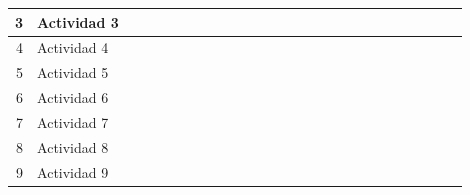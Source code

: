\documentclass[10pt,letterpaper]{report}
\begin{document}
\begin{landscape}
\begin{table}[htbp]
{\begin{tabular}{|r|l|r|r|r|r|r|r|r|r|r|r|r|r|r|r|r|r|r|r|r|r|r|r|r|r|}
            \midrule
            3     & Actividad 3 & \cellcolor[rgb]{ .557,  .663,  .859} & \cellcolor[rgb]{ .557,  .663,  .859} & \cellcolor[rgb]{ .557,  .663,  .859} &       &       &       &       &       &       &       &       &       &       &       &       &       &       &       &       &       &       &       &       &  \\
            \midrule
            4     & Actividad 4 &       &       &       &       &       &       &       & \cellcolor[rgb]{ .557,  .663,  .859} & \cellcolor[rgb]{ .557,  .663,  .859} & \cellcolor[rgb]{ .557,  .663,  .859} & \cellcolor[rgb]{ .557,  .663,  .859} & \cellcolor[rgb]{ .557,  .663,  .859} &       &       &       &       &       &       &       &       &       &       &       &  \\
            \midrule
            5     & Actividad 5 &       &       &       &       &       &       &       & \cellcolor[rgb]{ .557,  .663,  .859} & \cellcolor[rgb]{ .557,  .663,  .859} & \cellcolor[rgb]{ .557,  .663,  .859} & \cellcolor[rgb]{ .557,  .663,  .859} & \cellcolor[rgb]{ .557,  .663,  .859} &       &       &       &       &       &       &       &       &       &       &       &  \\
            \midrule
            6     & Actividad 6 &       &       &       &       &       &       &       &       &       &       &       &       & \cellcolor[rgb]{ .557,  .663,  .859} & \cellcolor[rgb]{ .557,  .663,  .859} & \cellcolor[rgb]{ .557,  .663,  .859} & \cellcolor[rgb]{ .557,  .663,  .859} &       &       &       &       &       &       &       &  \\
            \midrule
            7     & Actividad 7 &       &       &       &       &       &       &       &       &       &       &       &       &       & \cellcolor[rgb]{ .557,  .663,  .859} & \cellcolor[rgb]{ .557,  .663,  .859} & \cellcolor[rgb]{ .557,  .663,  .859} & \cellcolor[rgb]{ .557,  .663,  .859} & \cellcolor[rgb]{ .557,  .663,  .859} &       &       &       &       &       &  \\
            \midrule
            8     & Actividad 8 &       &       &       &       &       &       &       &       &       &       &       &       &       &       &       &       &       &       & \cellcolor[rgb]{ .557,  .663,  .859} & \cellcolor[rgb]{ .557,  .663,  .859} & \cellcolor[rgb]{ .557,  .663,  .859} & \cellcolor[rgb]{ .557,  .663,  .859} &       &  \\
            \midrule
            9     & Actividad 9 &       &       &       &       &       &       &       &       &       &       &       &       &       &       &       &       &       &       &       &       &       &       &       &  \\

\end{tabular}}
\end{table}
\end{landscape}
\end{document}
